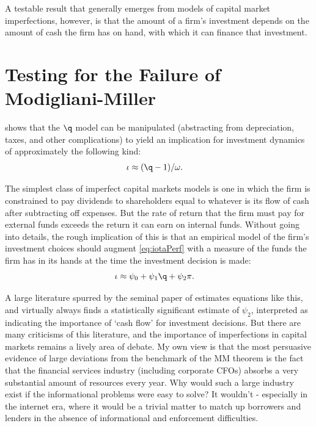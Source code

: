 \documentclass{handout}
\begin{document}
A testable result that generally emerges from models of capital market
imperfections, however, is that the amount of a firm's investment
depends on the amount of cash the firm has on hand, with which it can
finance that investment.

\section{Testing for the Failure of Modigliani-Miller}

 shows that the $\q$ model can be manipulated
(abstracting from depreciation, taxes, and other complications) to
yield an implication for investment dynamics of approximately the
following kind:
\begin{equation}\begin{gathered}\begin{aligned}
  \label{eq:iotaPerf}
   \iota & \approx  (\q-1)/\omega
.
\end{aligned}\end{gathered}\end{equation}

The simplest class of imperfect capital markets models is one in which
the firm is constrained to pay dividends to shareholders equal to
whatever is its flow of cash after subtracting off expenses.  But the 
rate of return that the firm must pay for external funds exceeds the
return it can earn on internal funds.  Without going into details, 
the rough implication of this is that an empirical model of 
the firm's investment choices should augment \eqref{eq:iotaPerf} with
a measure of the funds the firm has in its hands at the time the 
investment decision is made:
\begin{equation}\begin{gathered}\begin{aligned}
  \label{eq:iotaImp}
   \iota & \approx  \psi_{0} + \psi_{1} \q + \psi_{2} \pi
.
\end{aligned}\end{gathered}\end{equation}

A large literature spurred by the seminal paper of \cite{fhp}
estimates equations like this, and virtually always finds a
statistically significant estimate of $\psi_{2}$, interpreted as
indicating the importance of `cash flow' for investment decisions.
But there are many criticisms of this literature, and the importance
of imperfections in capital markets remains a lively area of debate.
My own view is that the most persuasive evidence of large deviations
from the benchmark of the MM theorem is the fact that the financial
services industry (including corporate CFOs) absorbs a very
substantial amount of resources every year.  Why would such a large
industry exist if the informational problems were easy to solve?  It
wouldn't - especially in the internet era, where it would be a trivial
matter to match up borrowers and lenders in the absence of
informational and enforcement difficulties.


\end{document}
